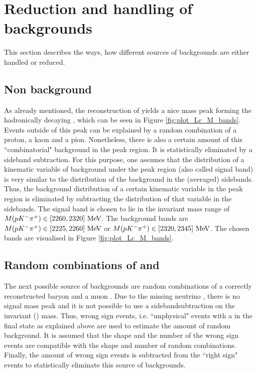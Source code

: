 \section{Reduction and handling of backgrounds}
This section describes the ways, how different sources of backgrounds are either handled or reduced.

\subsection{Non \Lc background}
As already mentioned, the reconstruction of \pKpi yields a nice mass peak forming the hadronically decaying \Lc, which can be seen in Figure \ref{fig:plot_Lc_M_bands}. 
Events outside of this peak can be explained by a random combination of a proton, a kaon and a pion.
Nonetheless, there is also a certain amount of this ``combinatorial" background in the peak region.
It is statistically eliminated by a sideband subtraction. 
For this purpose, one assumes that the distribution of a kinematic variable of background under the peak region (also called signal band) is very similar to the distribution of the background in the (averaged) sidebands.
Thus, the background distribution of a certain kinematic variable in the peak region is eliminated by subtracting the distribution of that variable in the sidebands.
The signal band is chosen to lie in the invariant \pKpi mass range of $M({p}{{K}^-}{{\pi}^+}) \in \left[2260, 2320\right]\mathrm{\,Me\kern -0.1em V}$.
The background bands are $M({p}{{K}^-}{{\pi}^+}) \in \left[2225, 2260\right]\mathrm{\,Me\kern -0.1em V}$ or $M({p}{{K}^-}{{\pi}^+}) \in \left[2320, 2345\right]\mathrm{\,Me\kern -0.1em V}$.
The chosen bands are visualised in Figure \ref{fig:plot_Lc_M_bands}.

\subsection{Random combinations of \Lc and \mun}
The next possible source of backgrounds are random combinations of a correctly reconstructed \Lc baryon and a muon \mun. 
Due to the missing neutrino \neumb, there is no signal mass peak and it is not possible to use a sidebandsubtraction on the invariant \pKpi\mun (\Lc\mun) mass.
Thus, wrong sign events, i.e. ``unphysical" events with a \Lc\mup in the final state as explained above are used to estimate the amount of random \Lc\mun background.
It is assumed that the shape and the number of the wrong sign events are compatible with the shape and number of random \Lc\mun combinations.
Finally, the amount of wrong sign events is subtracted from the ``right sign" events to statistically eliminate this source of backgrounds.

